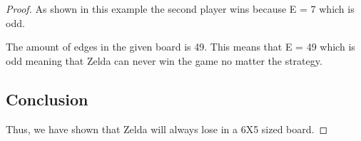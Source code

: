 \documentclass[answers]{exam}
\begin{document}
\begin{questions}
\begin{solution}
\begin{proof}
        As shown in this example the second player wins because E = 7 which is odd.


        The amount of edges in the given board is 49. This means that E = 49 which is odd meaning that Zelda can never win the game no matter the strategy.

		\subsection*{Conclusion}
		Thus, we have shown that Zelda will always lose in a 6X5 sized board.

        
        
            
        \end{proof}
			
		\end{solution}
		
		
	\end{questions}
	
\end{document}
